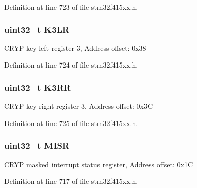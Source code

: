 Definition at line 723 of file stm32f415xx.\+h.

\subsubsection[{\texorpdfstring{K3\+LR}{K3LR}}]{ uint32\+\_\+t K3\+LR}\hypertarget{struct_c_r_y_p___type_def_a516c328fcb53ec754384e584caf890f5}{}\label{struct_c_r_y_p___type_def_a516c328fcb53ec754384e584caf890f5}
C\+R\+YP key left register 3, Address offset\+: 0x38 

Definition at line 724 of file stm32f415xx.\+h.

\subsubsection[{\texorpdfstring{K3\+RR}{K3RR}}]{ uint32\+\_\+t K3\+RR}\hypertarget{struct_c_r_y_p___type_def_a8fe249258f1733ec155c3893375c7a21}{}\label{struct_c_r_y_p___type_def_a8fe249258f1733ec155c3893375c7a21}
C\+R\+YP key right register 3, Address offset\+: 0x3C 

Definition at line 725 of file stm32f415xx.\+h.

\subsubsection[{\texorpdfstring{M\+I\+SR}{MISR}}]{ uint32\+\_\+t M\+I\+SR}\hypertarget{struct_c_r_y_p___type_def_a524e134cec519206cb41d0545e382978}{}\label{struct_c_r_y_p___type_def_a524e134cec519206cb41d0545e382978}
C\+R\+YP masked interrupt status register, Address offset\+: 0x1C 

Definition at line 717 of file stm32f415xx.\+h.

